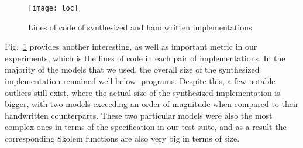 \begin{figure}[]
	\centering
	\texttt{[image: loc]}    	
	\caption{Lines of code of synthesized and handwritten implementations}
	\label{fg:loc}
\end{figure}

Fig.~\ref{fg:loc} provides another interesting, as well as important metric in
our experiments, which is the lines of code in each pair of implementations. In
the majority of the models that we used, the overall size of the synthesized
implementation remained well below \lustrev-programs. Despite this, a few
notable outliers still exist, where the actual size of the synthesized
implementation is bigger, with two models exceeding an order of magnitude when
compared to their handwritten counterparts. These two particular models were
also the most complex ones in terms of the specification in our test suite,
and as a result the corresponding Skolem functions are also very big in terms
of size.
%

